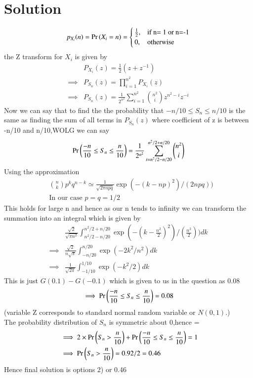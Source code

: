 \documentclass[journal,12pt,twocolumn]{IEEEtran}
\begin{document}
\section{Solution}
\[p_{X_i} (n)=\Pr\left(X_i = n\right)= \begin{cases}
            \frac{1}{2}, &\text{if n= 1 or n=-1}\\
             0, &\text{otherwise}\\
            \end{cases}
\]
the Z transform for \(X_i\) is given by\\
\begin{align}
&P_{X_i} (z)=\frac{1}{2}(z + z^{-1})\\
\implies& P_{S_n} (z)= \prod_{i=1}^{n^2} P_{X_i}(z)\\
\implies& P_{S_n} (z)= \frac{1}{2^{n^2}}\sum_{i=1}^{n^2} {{n^2}\choose{i}} z^{{n^2}-i} z^{-i}
\end{align}
Now we can say that to find the the probability that \(-n/10 \leq S_n  \leq n/10\) is the same as finding the sum of all terms in \(P_{S_n}(z)\) where coefficient of z is between -n/10 and n/10,WOLG we can say 
\begin{align}
    \Pr\left(\frac{-n}{10} \leq S_n \leq \frac{n}{10}\right)= \frac{1}{2^{n^2}}\sum_{i={n^2/2-n/20}}^{n^2/2 +n/20} {n^2\choose i}
\end{align}
Using the approximation
\begin{align}
    &{n\choose k}{p^k}{q^{n-k}}\simeq \frac{1}{\sqrt{ 2\pi npq}} \exp(-(k-np)^2)/(2npq))  \\
    &\text{In our case } p=q=1/2 \nonumber
\end{align}
This holds for large n and hence as our n tends to infinity we can transform the summation into an integral
which is given by
\begin{align}
   &\frac{\sqrt{2}}{\sqrt{\pi{n^2}}} \int_{{n^2}/2 -n/20}^{{n^2}/2 +n/20}
   \exp(-(k-\frac{n^2}{2})^2)/(\frac{n^2}{2})) dk\\
   \implies &\frac{\sqrt{2}}{n\sqrt{\pi}} \int_{-n/20}^{n/20}  \exp(-2 k^2/n^2) dk\\
   \implies &\frac{1}{\sqrt{2\pi}} \int_{-1/10}^{1/10}  \exp(-k^2/2) dk
\end{align}
This is just \(G(0.1) - G(-0.1)\) which is given to us in the question as 0.08
\begin{align}
\implies \Pr\left(\frac{-n}{10} \leq S_n \leq \frac{n}{10}\right)=0.08
\end{align}
(variable Z corresponds to standard normal random variable or \( N(0,1)\).)\\ 
The probability distribution of \(S_n\) is symmetric about 0,hence  = \\
\begin{align}
  &  \implies 2\times \Pr\left(S_n>\frac{n}{10}\right) + \Pr\left(\frac{-n}{10} \leq S_n \leq \frac{n}{10}\right) =1\\
  &  \implies  \Pr\left(S_n>\frac{n}{10}\right)=0.92/2=0.46
\end{align}
Hence final solution is options 2) or 0.46
\end{document}
